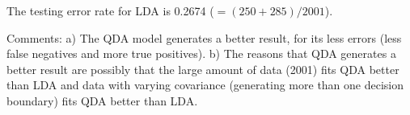 \documentclass[10pt]{article}
\begin{document}
\begin{enumerate}[1)]
The testing error rate for LDA is 0.2674 ($=(250+285)/2001$).
\vspace{3mm}

Comments:
\subitem
a) The QDA model generates a better result, for its less errors (less false negatives and more true positives).
\subitem
b) The reasons that QDA generates a better result are possibly that the large amount of data (2001) fits QDA better than LDA and data with varying covariance (generating more than one decision boundary) fits QDA better than LDA. %

\end{enumerate}
\end{document}
